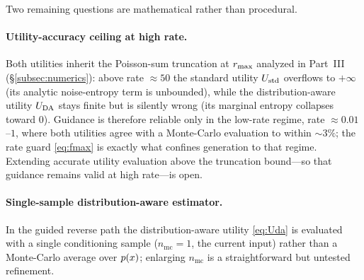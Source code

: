 Two remaining questions are mathematical rather than procedural.

\paragraph{Utility-accuracy ceiling at high rate.}
Both utilities inherit the Poisson-sum truncation at $r_{\max}$ analyzed in Part~III
(\S\ref{subsec:numerics}): above rate $\approx\!50$ the standard utility $U_{\mathrm{std}}$
overflows to $+\infty$ (its analytic noise-entropy term is unbounded), while the
distribution-aware utility $U_{\mathrm{DA}}$ stays finite but is silently wrong (its marginal
entropy collapses toward $0$). Guidance is therefore reliable only in the low-rate
regime, rate $\approx\!0.01$--$1$, where both utilities agree with a Monte-Carlo
evaluation to within $\sim\!3\%$; the rate guard \eqref{eq:fmax} is exactly what
confines generation to that regime. Extending accurate utility evaluation above the
truncation bound---so that guidance remains valid at high rate---is open.

\paragraph{Single-sample distribution-aware estimator.}
In the guided reverse path the distribution-aware utility \eqref{eq:Uda} is
evaluated with a single conditioning sample ($n_{\mathrm{mc}}=1$, the current
input) rather than a Monte-Carlo average over $p(x)$; enlarging $n_{\mathrm{mc}}$ is
a straightforward but untested refinement.
